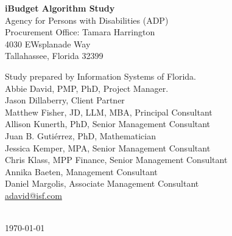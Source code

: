 \begin{flushleft}

\phantom{ghost text}

\vspace{\fill}

\noindent \textbf{iBudget Algorithm Study} \\
Agency for Persons with Disabilities (ADP) \\
Procurement Office: Tamara Harrington \\
4030 EWsplanade Way \\
Tallahassee, Florida 32399

\vspace{1cm}

\noindent Study prepared by Information Systems of Florida. \\
Abbie David, PMP, PhD, Project Manager. \\
Jason Dillaberry, Client Partner \\
Matthew Fisher, JD, LLM, MBA, Principal Consultant \\
Allison Kunerth, PhD, Senior Management Consultant \\
Juan B. Gutiérrez, PhD, Mathematician \\
Jessica Kemper, MPA, Senior Management Consultant \\
Chris Klass, MPP Finance, Senior Management Consultant \\
Annika Baeten, Management Consultant \\
Daniel Margolis, Associate Management Consultant \\

\href{mailto:adavid@isf.com}{adavid@isf.com}

\vspace{0.5in}

\noindent \TheAuthor \\
\today
\end{flushleft}


\newpage



\tableofcontents

\newpage


